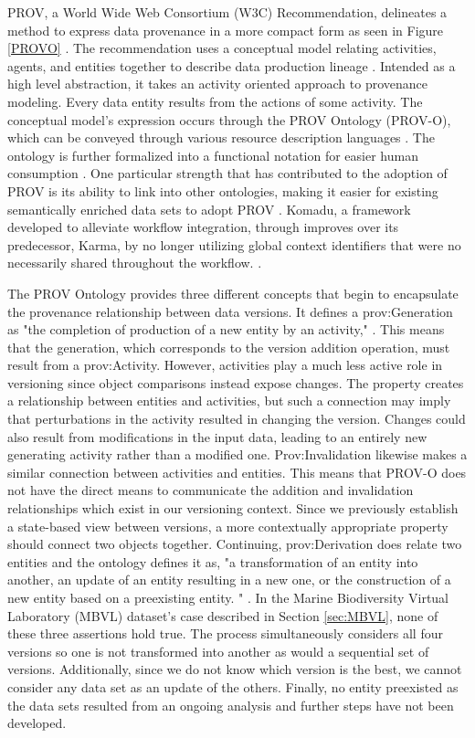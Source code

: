 PROV, a World Wide Web Consortium (W3C) Recommendation, delineates a method to express data provenance in a more compact form as seen in Figure \ref{PROVO} \cite{Gil2013a} \cite{Groth2013}.
The recommendation uses a conceptual model relating activities, agents, and entities together to describe data production lineage \cite{Moreau2013c} \cite{Nies2013} \cite{Nies2013a}.
Intended as a high level abstraction, it takes an activity oriented approach to provenance modeling.
Every data entity results from the actions of some activity.
The conceptual model's expression occurs through the PROV Ontology (PROV-O), which can be conveyed through various resource description languages \cite{Lebo2013} \cite{Hua2013} \cite{Klyne2013}.
The ontology is further formalized into a functional notation for easier human consumption \cite{Moreau2013b} \cite{Cheney2013a}.
One particular strength that has contributed to the adoption of PROV is its ability to link into other ontologies, making it easier for existing semantically enriched data sets to adopt PROV \cite{Miles2013} \cite{Moreau2013}.
Komadu, a framework developed to alleviate workflow integration, through improves over its predecessor, Karma, by no longer utilizing global context identifiers that were no necessarily shared throughout the workflow. \cite{Suriarachchi_2015}.

The PROV Ontology provides three different concepts that begin to encapsulate the provenance relationship between data versions.
It defines a prov:Generation as "the completion of production of a new entity by an activity," \cite{Lebo2013}.
This means that the generation, which corresponds to the version addition operation, must result from a prov:Activity.
However, activities play a much less active role in versioning since object comparisons instead expose changes.
The property creates a relationship between entities and activities, but such a connection may imply that perturbations in the activity resulted in changing the version.
Changes could also result from modifications in the input data, leading to an entirely new generating activity rather than a modified one.
Prov:Invalidation likewise makes a similar connection between activities and entities.
This means that PROV-O does not have the direct means to communicate the addition and invalidation relationships which exist in our versioning context.
Since we previously establish a state-based view between versions, a more contextually appropriate property should connect two objects together.
Continuing, prov:Derivation does relate two entities and the ontology defines it as, "a transformation of an entity into another, an update of an entity resulting in a new one, or the construction of a new entity based on a preexisting entity. " \cite{Lebo2013}.
In the Marine Biodiversity Virtual Laboratory (MBVL) dataset's case described in Section \ref{sec:MBVL}, none of these three assertions hold true. 
The process simultaneously considers all four versions so one is not transformed into another as would a sequential set of versions.
Additionally, since we do not know which version is the best, we cannot consider any data set as an update of the others.
Finally, no entity preexisted as the data sets resulted from an ongoing analysis and further steps have not been developed.

